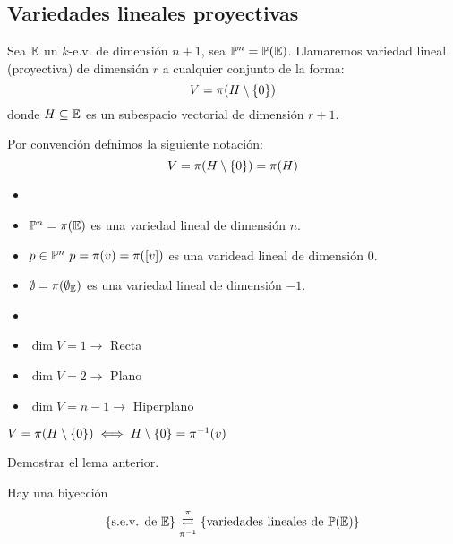 \subsection{Variedades lineales proyectivas}
    \begin{defi}
        Sea $\mathbb{E}$ un $k$-e.v. de dimensión $n+1$, sea $\mathbb{P}^n = \mathbb{P}(\mathbb{E})$.
        Llamaremos variedad lineal (proyectiva) de dimensión $r$ a cualquier conjunto 
        de la forma:
        \[V = \pi(H \setminus \left\{0\right\})\]
        donde $H \subseteq \mathbb{E}$ es un subespacio vectorial de dimensión $r+1$.
        
        Por convención defnimos la siguiente notación:
        \[V = \pi(H \setminus \left\{0\right\}) = \pi(H)\]         
    \end{defi}    
    \begin{example}
        \begin{itemize}
            \item []
            \item $\mathbb{P}^n = \pi(\mathbb{E})$ es una variedad lineal de dimensión $n$.
            \item $p \in \mathbb{P}^n \ p = \pi(v) = \pi([v])$ es una varidead lineal de dimensión $0$.
            \item $\emptyset = \pi({\emptyset_{\mathbb{E}}})$ es una variedad lineal de dimensión $-1$.
        \end{itemize}
    \end{example}
    \begin{defi}
        \begin{itemize}
            \item []
            \item $\dim V = 1 \longrightarrow$ Recta
            \item $\dim V = 2 \longrightarrow$ Plano
            \item $\dim V = n-1 \longrightarrow$ Hiperplano
        \end{itemize}
    \end{defi}
    \begin{lema}
        $V = \pi(H\setminus\left\{0\right\}) \iff H \setminus \left\{0\right\} = \pi^{-1}(v)$
    \end{lema}
    \begin{ej}
        Demostrar el lema anterior.
    \end{ej}
    \begin{obs}
        Hay una biyección
        \[\left\{\text{s.e.v. de } \mathbb{E}\right\}
         \mathrel{\mathop{\rightleftarrows}^{\mathrm{\pi}}_{\mathrm{\pi^{-1}}}}
         \left\{\text{variedades lineales de } \mathbb{P}(\mathbb{E})\right\}\]
    \end{obs}
